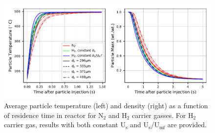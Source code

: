 \documentclass{article}
\begin{document}
\begin{figure}[H]
    \centering
    \includegraphics[width=\textwidth]{figures/cfd-constuumf-particle-temp-density.pdf}
    \caption{Average particle temperature (left) and density (right) as a function of residence time in reactor for N$_2$ and H$_2$ carrier gasses. For H$_2$ carrier gas, results with both constant U$_\text{s}$ and U$_\text{s}$/U$_\text{mf}$ are provided.}
    \label{fig:cfd-constuumf-particle-temp-density}
\end{figure}
\end{document}
